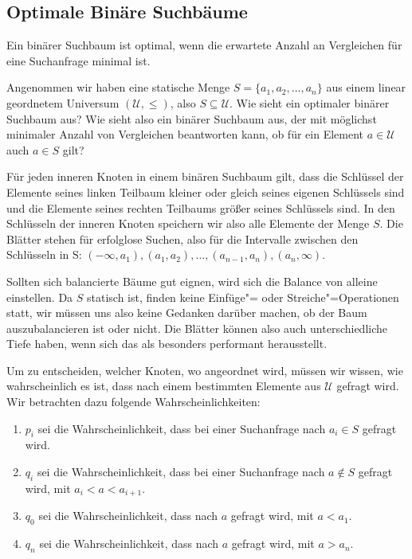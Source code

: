 \subsection{Optimale Binäre Suchbäume}
\begin{Def}
  \hspace{\parindent}Ein binärer Suchbaum ist optimal, wenn die erwartete Anzahl an Vergleichen für eine Suchanfrage minimal ist.
\end{Def}

Angenommen wir haben eine statische Menge $S = \{a_1, a_2, \ldots, a_n\}$ aus einem linear geordnetem Universum $(\mathcal{U}, \le)$, also $S \subseteq \mathcal{U}$. Wie sieht ein optimaler binärer Suchbaum aus? Wie sieht also ein binärer Suchbaum aus, der mit möglichst minimaler Anzahl von Vergleichen beantworten kann, ob für ein Element $a \in \mathcal{U}$ auch $a \in S$ gilt?

Für jeden inneren Knoten in einem binären Suchbaum gilt, dass die Schlüssel der Elemente seines linken Teilbaum kleiner oder gleich seines eigenen Schlüssels sind und die Elemente seines rechten Teilbaums größer seines Schlüssels sind. In den Schlüsseln der inneren Knoten speichern wir also alle Elemente der Menge $S$. Die Blätter stehen für erfolglose Suchen, also für die Intervalle zwischen den Schlüsseln in S: $(-\infty, a_1), (a_1, a_2), \ldots, (a_{n-1}, a_n), (a_n, \infty)$.

Sollten sich balancierte Bäume gut eignen, wird sich die Balance von alleine einstellen. Da $S$ statisch ist, finden keine Einfüge"= oder Streiche"=Operationen statt, wir müssen uns also keine Gedanken darüber machen, ob der Baum auszubalancieren ist oder nicht. Die Blätter können also auch unterschiedliche Tiefe haben, wenn sich das als besonders performant herausstellt.

Um zu entscheiden, welcher Knoten, wo angeordnet wird, müssen wir wissen, wie wahrscheinlich es ist, dass nach einem bestimmten Elemente aus $\mathcal{U}$ gefragt wird. Wir betrachten dazu folgende Wahrscheinlichkeiten:
\begin{enumerate}
  \item $p_i$ sei die Wahrscheinlichkeit, dass bei einer Suchanfrage nach $a_i \in S$ gefragt wird.
  \item $q_i$ sei die Wahrscheinlichkeit, dass bei einer Suchanfrage nach $a \notin S$ gefragt wird, mit $a_i < a < a_{i+1}$.
  \item $q_0$ sei die Wahrscheinlichkeit, dass nach $a$ gefragt wird, mit $a < a_1$.
  \item $q_n$ sei die Wahrscheinlichkeit, dass nach $a$ gefragt wird, mit $a > a_n$.
\end{enumerate}

